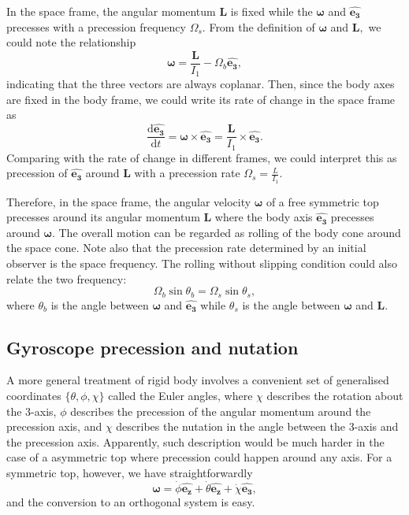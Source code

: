 \documentclass{article}
\begin{document}
In the space frame, the angular momentum $\mathbf{L}$ is fixed while the $\boldsymbol{\mathbf{\omega}} $ and $\hat{\mathbf{e_3}}$ precesses with a precession frequency $\Omega_s.$ From the definition of $\boldsymbol{\mathbf{\omega}} $ and $\mathbf{L},$ we could note the relationship 
\[
    \boldsymbol{\mathbf{\omega}} = \frac{\mathbf{L}}{I_1} - \Omega_b \hat{\mathbf{e_3}},  
\]
indicating that the three vectors are always coplanar. Then, since the body axes are fixed in the body frame, we could write its rate of change in the space frame as 
\[
    \frac{\mathrm{d}\hat{\mathbf{e_3} }}{\mathrm{d}t} = 
    \boldsymbol{\mathbf{\omega}} \times \hat{\mathbf{e_3} }
    = \frac{\mathbf{L} }{I_1} \times \hat{\mathbf{e_3} }.
\]
Comparing with the rate of change in different frames, we could interpret this as precession of $\hat{\mathbf{e_3} }$ around $\mathbf{L}$ with a precession rate $\boxed{\Omega_s = \frac{L}{I_1}}.$

Therefore, in the space frame, the angular velocity $\boldsymbol{\mathbf{\omega}} $ of a free symmetric top precesses around its angular momentum $\mathbf{L} $ where the body axis $\hat{\mathbf{e_3} }$ precesses around $\boldsymbol{\mathbf{\omega}}.$ The overall motion can be regarded as rolling of the body cone around the space cone. Note also that the precession rate determined by an initial observer is the space frequency. The rolling without slipping condition could also relate the two frequency:
\[
    \Omega_b \sin{\theta_b} = \Omega_s \sin{\theta_s},
\]
where $\theta_b$ is the angle between $\boldsymbol{\mathbf{\omega}}$ and $\hat{\mathbf{e_3} }$ while $\theta_s$ is the angle between $\boldsymbol{\mathbf{\omega}}$ and $\mathbf{L}.$ 

\subsection{Gyroscope precession and nutation}
A more general treatment of rigid body involves a convenient set of generalised coordinates $\{\theta, \phi, \chi\}$ called the Euler angles, where $\chi$ describes the rotation about the 3-axis, $\phi$ describes the precession of the angular momentum around the precession axis, and $\chi$ describes the nutation in the angle between the 3-axis and the precession axis. Apparently, such description would be much harder in the case of a asymmetric top where precession could happen around any axis. For a symmetric top, however, we have straightforwardly 
\[
    \boldsymbol{\mathbf{\omega}} = \dot{\phi} \hat{\mathbf{e_z}} + \dot{\theta} \hat{\mathbf{e_z}} + \dot{\chi } \hat{\mathbf{e_3}}, 
\]
and the conversion to an orthogonal system is easy. 
\end{document}
